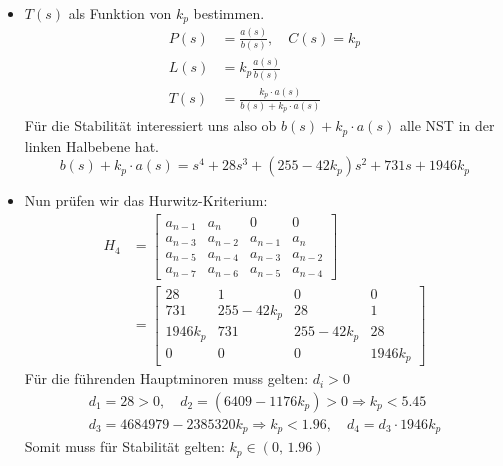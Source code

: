     \begin{itemize}
        \item $T(s)$ als Funktion von $k_p$ bestimmen.
            \begin{align*}
                P(s) &= \frac{a(s)}{b(s)},\quad C(s) = k_p\\
                L(s) &=  k_p\frac{a(s)}{b(s)}\\
                T(s) &=  \frac{k_p\cdot a(s)}{b(s) + k_p\cdot a(s)}
            \end{align*}
            Für die Stabilität interessiert uns also ob $b(s) + k_p\cdot a(s)$ alle NST in der linken Halbebene hat.
            \begin{equation*}
                b(s) + k_p\cdot a(s) = s^4 + 28s^3 + (255-42k_p)s^2 + 731s + 1946k_p
            \end{equation*}
        
        \item Nun prüfen wir das Hurwitz-Kriterium:
            \begin{align*}
                H_4 &= 
                \begin{bmatrix}
                a_{n-1} & a_n & 0 & 0\\
                a_{n-3} & a_{n-2} & a_{n-1} & a_n\\
                a_{n-5} & a_{n-4} & a_{n-3} & a_{n-2}\\
                a_{n-7} & a_{n-6} & a_{n-5} & a_{n-4}
                \end{bmatrix}\\
                &= 
                \begin{bmatrix}
                28 & 1 & 0 & 0\\
                731 & 255-42k_p & 28 & 1\\
                1946k_p &731 & 255-42k_p & 28\\
                0   &   0   &   0   &   1946k_p
                \end{bmatrix}
            \end{align*}
            Für die führenden Hauptminoren muss gelten: $d_i > 0$
            \begin{gather*}
                d_1 = 28 > 0,\quad  d_2 = (6409-1176k_p) > 0 \Rightarrow k_p < 5.45\\
                d_3 = 4684979-2385320k_p \Rightarrow k_p < 1.96,\quad d_4 = d_3\cdot1946k_p 
            \end{gather*}
            Somit muss für Stabilität gelten: $k_p\in(0,\,1.96)$
    \end{itemize}